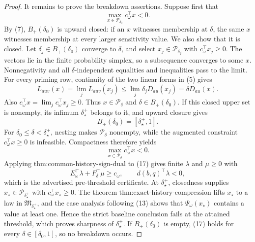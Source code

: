 \documentclass{article}
\begin{document}
\begin{proof}
It remains to prove the breakdown assertions.  Suppose first that
\[
 \max_{x\in\mathcal P_{\delta_0}}c_\omega^{\top}x<0.
\tag{14}
\]
By (7), \(B_+(\delta_0)\) is upward closed: if an \(x\) witnesses membership at \(\delta\), the same \(x\) witnesses membership at every larger sensitivity value.  We also show that it is closed.  Let \(\delta_j\in B_+(\delta_0)\) converge to \(\delta\), and select \(x_j\in\mathcal P_{\delta_j}\) with \(c_\omega^{\top}x_j\geq0\).  The vectors lie in the finite probability simplex, so a subsequence converges to some \(x\).  Nonnegativity and all \(\delta\)-independent equalities and inequalities pass to the limit.  For every priming row, continuity of the two linear forms in (5) gives
\[
 L_{auv}(x)
 =\lim_jL_{auv}(x_j)
 \leq\lim_j\delta_jD_{au}(x_j)
 =\delta D_{au}(x).
\tag{15}
\]
Also \(c_\omega^{\top}x=\lim_jc_\omega^{\top}x_j\geq0\).  Thus \(x\in\mathcal P_\delta\) and \(\delta\in B_+(\delta_0)\).  If this closed upper set is nonempty, its infimum \(\delta_\star^+\) belongs to it, and upward closure gives
\[
 B_+(\delta_0)=[\delta_\star^+,1].
\tag{16}
\]
For \(\delta_0\leq\delta<\delta_\star^+\), nesting makes \(\mathcal P_\delta\) nonempty, while the augmented constraint \(c_\omega^{\top}x\geq0\) is infeasible.  Compactness therefore yields
\[
 \max_{x\in\mathcal P_\delta}c_\omega^{\top}x<0.
\tag{17}
\]
Applying \(\text{thm:common-history-sign-dual}\) to (17) gives finite \(\lambda\) and \(\mu\geq0\) with
\[
 E_\omega^{\top}\lambda+F_\delta^{\top}\mu\geq c_\omega,
 \qquad d(b,q)^{\top}\lambda<0,
\tag{18}
\]
which is the advertised pre-threshold certificate.  At \(\delta_\star^+\), closedness supplies \(x_\star\in\mathcal P_{\delta_\star^+}\) with \(c_\omega^{\top}x_\star\geq0\).  The theorem \(\text{thm:exact-history-compression}\) lifts \(x_\star\) to a law in \(\mathfrak M_{\delta_\star^+}\), and the case analysis following (13) shows that \(\Psi_\omega(x_\star)\) contains a value at least one.  Hence the strict baseline conclusion fails at the attained threshold, which proves sharpness of \(\delta_\star^+\).  If \(B_+(\delta_0)\) is empty, (17) holds for every \(\delta\in[\delta_0,1]\), so no breakdown occurs.


\end{proof}
\end{document}
